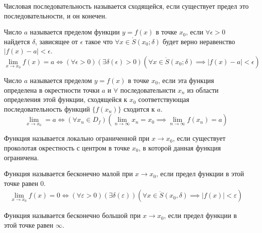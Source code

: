 \begin{definition}\label{def:26}
    Числовая последовательность называется сходящейся, если существует предел это последовательности, и он конечен.
\end{definition}


\begin{definition} \label{def:28}
    Число $a$ называется пределом функции $y = f\left( x \right) $ в точке $x_0$, если $\forall \epsilon > 0$ найдется $\delta$, зависящее от  $\epsilon$ такое что $\forall x \in \mathring{S}(x_0; \delta)$ будет верно неравенство $|f\left( x \right) - a| < \epsilon$.
    \[
        \lim_{x \to x_0} f(x) = a \iff (\forall \epsilon > 0)(\exists  \delta(\epsilon) > 0)(\forall  x \in \mathring{S}(x_0; \delta) \implies |f(x) - a| < \epsilon)
    \]
\end{definition}


\begin{definition} \label{def:29}
    Число $a$ называется пределом $y = f\left( x \right) $ в точке $x_0$, если эта функция определена в окрестности точки $a$ и $\forall$ последовательнсти $x_{n}$ из области определения этой функции, сходящейся к $x_0$ соответствующая последовательность функций $\{f(x_{n})\}$ сходится к $a$. \[
        \lim_{x \to x_0} = a \iff (\forall x_{n}\in D_f)(\lim_{n \to \infty} x_{n} = x_0 \implies \lim_{n \to \infty} f(x_{n}) = a) 
    \] 
\end{definition}


\begin{definition} \label{def:34}
    Функция называется локально ограниченной при $x \to x_0$, если существует проколотая окрестность с центром в точке $x_0$, в которой данная функция ограничена.
\end{definition}


\begin{definition} \label{def:35}
    Функция называется бесконечно малой при $x \to x_0$, если предел функции в этой точке равен $0$.
    \begin{gather*}
        \lim_{x \to x_0} f(x) = 0 \iff (\forall \varepsilon > 0)(\exists \delta(\varepsilon)) (\forall x \in \mathring{S}(x_0, \delta) \implies |f(x)| < \varepsilon )
    \end{gather*}
\end{definition}


\begin{definition} \label{def:36}
    Функция называется бесконечно большой при $x \to x_0$, если предел функции в этой точке равен $\infty$.
\end{definition}


